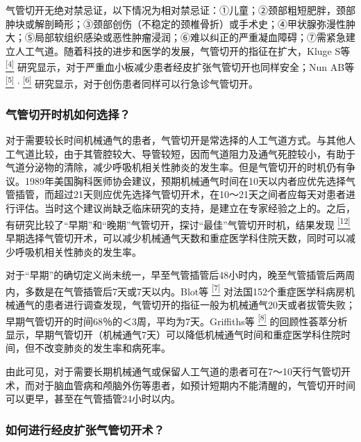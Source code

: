气管切开无绝对禁忌证，以下情况为相对禁忌证：①儿童；②颈部粗短肥胖，颈部肿块或解剖畸形；③颈部创伤（不稳定的颈椎骨折）或手术史；④甲状腺弥漫性肿大；⑤局部软组织感染或恶性肿瘤浸润；⑥难以纠正的严重凝血障碍；⑦需紧急建立人工气道。随着科技的进步和医学的发展，气管切开的指征在扩大，Kluge
S等
\protect\hyperlink{text00015.htmlux5cux23ch4-14}{\textsuperscript{{[}4{]}}}
研究显示，对于严重血小板减少患者经皮扩张气管切开也同样安全；Nun AB等
\protect\hyperlink{text00015.htmlux5cux23ch5-14}{\textsuperscript{{[}5{]}}}
\textsuperscript{,}
\protect\hyperlink{text00015.htmlux5cux23ch6-14}{\textsuperscript{{[}6{]}}}
研究显示，对于创伤患者同样可以行急诊气管切开。

\subsubsection{气管切开时机如何选择？}

对于需要较长时间机械通气的患者，气管切开是常选择的人工气道方式。与其他人工气道比较，由于其管腔较大、导管较短，因而气道阻力及通气死腔较小，有助于气道分泌物的清除，减少呼吸机相关性肺炎的发生率。但是气管切开的时机仍有争议。1989年美国胸科医师协会建议，预期机械通气时间在10天以内者应优先选择气管插管，而超过21天则应优先选择气管切开术，在10～21天之间者应每天对患者进行评估。当时这个建议尚缺乏临床研究的支持，是建立在专家经验之上的。之后，有研究比较了“早期”和“晚期”气管切开，探讨“最佳”气管切开时机，结果发现
\protect\hyperlink{text00015.htmlux5cux23ch12-14}{\textsuperscript{{[}12{]}}}
早期选择气管切开术，可以减少机械通气天数和重症医学科住院天数，同时可以减少呼吸机相关性肺炎的发生率。

对于“早期”的确切定义尚未统一，早至气管插管后48小时内，晚至气管插管后两周内，多数是在气管插管后7天或7天以内。Blot等
\protect\hyperlink{text00015.htmlux5cux23ch7-14}{\textsuperscript{{[}7{]}}}
对法国152个重症医学科病房机械通气的患者进行调查发现，气管切开的指征一般为机械通气20天或者拔管失败；早期气管切开的时间68％的＜3周，平均为7天。Griffiths等
\protect\hyperlink{text00015.htmlux5cux23ch8-14}{\textsuperscript{{[}8{]}}}
的回顾性荟萃分析显示，早期气管切开（机械通气7天）可以降低机械通气时间和重症医学科住院时间，但不改变肺炎的发生率和病死率。

由此可见，对于需要长期机械通气或保留人工气道的患者可在7～10天行气管切开术，而对于脑血管病和颅脑外伤等患者，如预计短期内不能清醒的，气管切开时间可以更早，甚至在气管插管24小时以内。

\subsubsection{如何进行经皮扩张气管切开术？}

